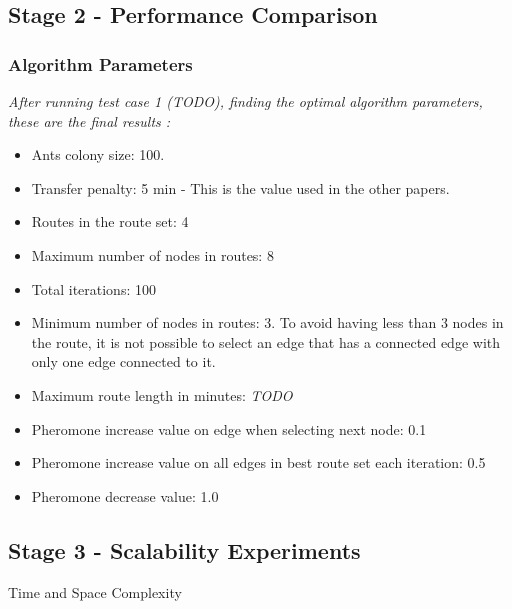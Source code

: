 \subsection{Stage 2 - Performance Comparison}

\subsubsection{Algorithm Parameters}
\emph{\color{red} After running test case 1 (TODO), finding the optimal algorithm parameters, these are the final results :}

\begin{itemize}
\item Ants colony size: 100.
\item Transfer penalty: 5 min - This is the value used in the other papers.
\item Routes in the route set: 4
\item Maximum number of nodes in routes: 8
\item Total iterations: 100
\item Minimum number of nodes in routes: 3. To avoid having less than 3 nodes in the route, it is not possible to select an edge that has a connected edge with only one edge connected to it.
\item Maximum route length in minutes: \emph{\color{red} TODO}
\item Pheromone increase value on edge when selecting next node: 0.1
\item Pheromone increase value on all edges in best route set each iteration: 0.5
\item Pheromone decrease value: 1.0
\end{itemize}

\subsection{Stage 3 -  Scalability Experiments}
Time and Space Complexity
